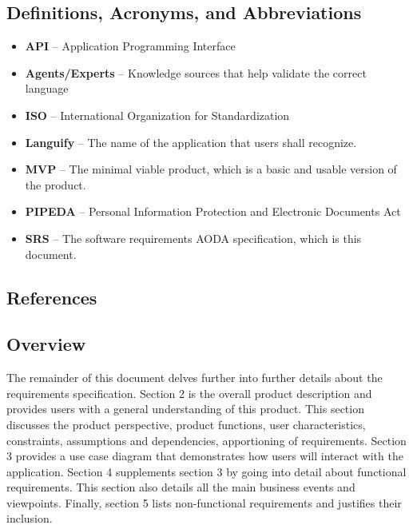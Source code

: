\subsection{Definitions, Acronyms, and Abbreviations}
\label{sub:definitions_acronyms_and_abbreviations}
\begin{itemize}
	\item \textbf{API} – Application Programming Interface
	\item \textbf{Agents/Experts} – Knowledge sources that help validate the correct language
	\item \textbf{ISO} – International Organization for Standardization
	\item \textbf{Languify} – The name of the application that users shall recognize.
	\item \textbf{MVP} – The minimal viable product, which is a basic and usable version of the product.
	\item \textbf{PIPEDA} – Personal Information Protection and Electronic Documents Act
	\item \textbf{SRS} – The software requirements AODA specification, which is this document.
\end{itemize}


\subsection{References}
\label{sub:references}
% 
% 


\subsection{Overview}
\label{sub:overview}
The remainder of this document delves further into further details about the requirements specification. Section 2 is the overall product description and provides users with a general understanding of this product. This section discusses the product perspective, product functions, user characteristics, constraints, assumptions and dependencies, apportioning of requirements. Section 3 provides a use case diagram that demonstrates how users will interact with the application. Section 4 supplements section 3 by going into detail about functional requirements. This section also details all the main business events and viewpoints. Finally, section 5 lists non-functional requirements and justifies their inclusion.

